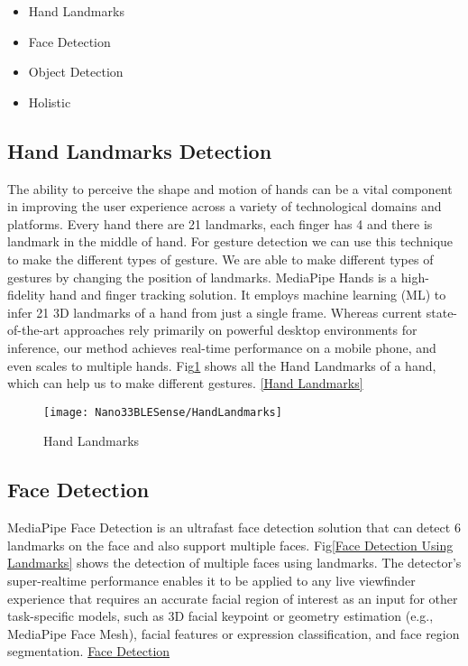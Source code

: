 \begin{itemize}
	\item Hand Landmarks
	\item Face Detection
	\item Object Detection
	\item Holistic
\end{itemize}

\subsection{Hand Landmarks Detection}

The ability to perceive the shape and motion of hands can be a vital component in improving the user experience across a variety of technological domains and platforms. Every hand there are 21 landmarks, each finger has 4 and there is landmark in the middle of hand. For gesture detection we can use this technique to make the different types of gesture. We are able to make different types of gestures by changing the position of landmarks. MediaPipe Hands is a high-fidelity hand and finger tracking solution. It employs machine learning (ML) to infer 21 3D landmarks of a hand from just a single frame. Whereas current state-of-the-art approaches rely primarily on powerful desktop environments for inference, our method achieves real-time performance on a mobile phone, and even scales to multiple hands. Fig\ref{Hand Landmarks} shows all the Hand Landmarks of a hand, which can help us to make different gestures. \href{https://google.github.io/mediapipe/solutions/hands.html}{[Hand Landmarks]}

\begin{figure}[h]
	\centering
	\texttt{[image: Nano33BLESense/HandLandmarks]}
	\caption{Hand Landmarks}
	\label{Hand Landmarks}
\end{figure} 

\subsection{Face Detection}
MediaPipe Face Detection is an ultrafast face detection solution that can detect 6 landmarks on the face and also support multiple faces. Fig\ref{Face Detection Using Landmarks} shows the detection of multiple faces using landmarks. The detector’s super-realtime performance enables it to be applied to any live viewfinder experience that requires an accurate facial region of interest as an input for other task-specific models, such as 3D facial keypoint or geometry estimation (e.g., MediaPipe Face Mesh), facial features or expression classification, and face region segmentation. \href{https://google.github.io/mediapipe/solutions/face_detection.html}{Face Detection}

